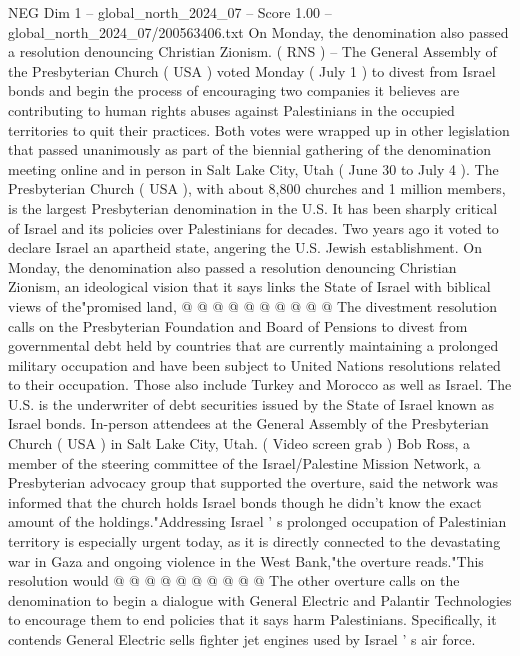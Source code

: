 \begin{textsample}{NEG Dim 1 – global\_north\_2024\_07 – Score 1.00 – global\_north\_2024\_07/200563406.txt}  \label{ex:f1_neg_062}
On Monday, the denomination also passed a resolution denouncing Christian Zionism. ( RNS ) -- The General Assembly of the Presbyterian Church ( USA ) voted Monday ( July 1 ) to divest from Israel bonds and begin the process of encouraging two companies it believes are contributing to human rights abuses against Palestinians in the occupied territories to quit their practices.
Both votes were wrapped up in other legislation that passed unanimously as part of the biennial gathering of the denomination meeting online and in person in Salt Lake City, Utah ( June 30 to July 4 ).
The Presbyterian Church ( USA ), with about 8,800 churches and 1 million members, is the largest Presbyterian denomination in the U.S.
It has been sharply critical of Israel and its policies over Palestinians for decades.
Two years ago it voted to declare Israel an apartheid state, angering the U.S.
Jewish establishment.
On Monday, the denomination also passed a resolution denouncing Christian Zionism, an ideological vision that it says links the State of Israel with biblical views of the"promised land, @ @ @ @ @ @ @ @ @ @ The divestment resolution calls on the Presbyterian Foundation and Board of Pensions to divest from governmental debt held by countries that are currently maintaining a prolonged military occupation and have been subject to United Nations resolutions related to their occupation.
Those also include Turkey and Morocco as well as Israel.
The U.S. is the underwriter of debt securities issued by the State of Israel known as Israel bonds.
In-person attendees at the General Assembly of the Presbyterian Church ( USA ) in Salt Lake City, Utah. ( Video screen grab ) Bob Ross, a member of the steering committee of the Israel/Palestine Mission Network, a Presbyterian advocacy group that supported the overture, said the network was informed that the church holds Israel bonds though he didn't know the exact amount of the holdings."Addressing Israel ' s prolonged occupation of Palestinian territory is especially urgent today, as it is directly connected to the devastating war in Gaza and ongoing violence in the West Bank,"the overture reads."This resolution would @ @ @ @ @ @ @ @ @ @ The other overture calls on the denomination to begin a dialogue with General Electric and Palantir Technologies to encourage them to end policies that it says harm Palestinians.
Specifically, it contends General Electric sells fighter jet engines used by Israel ' s air force.

\end{textsample}
